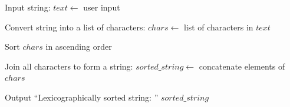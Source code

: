 \begin{algorithm}
\caption{Sort a String Lexicographically}
\begin{algorithmic}[1]

\STATE Input string:
\STATE $text \gets$ user input

\STATE Convert string into a list of characters:
\STATE $chars \gets$ list of characters in $text$

\STATE Sort $chars$ in ascending order

\STATE Join all characters to form a string:
\STATE $sorted\_string \gets$ concatenate elements of $chars$

\STATE Output ``Lexicographically sorted string: '' $sorted\_string$

\end{algorithmic}
\end{algorithm}